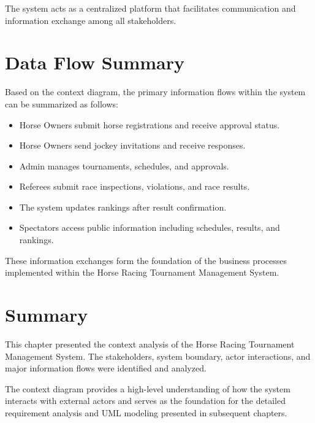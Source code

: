 The system acts as a centralized platform that facilitates communication and information exchange among all stakeholders.

\section{Data Flow Summary}

Based on the context diagram, the primary information flows within the system can be summarized as follows:

\begin{itemize}
	\item Horse Owners submit horse registrations and receive approval status.
	\item Horse Owners send jockey invitations and receive responses.
	\item Admin manages tournaments, schedules, and approvals.
	\item Referees submit race inspections, violations, and race results.
	\item The system updates rankings after result confirmation.
	\item Spectators access public information including schedules, results, and rankings.
\end{itemize}

These information exchanges form the foundation of the business processes implemented within the Horse Racing Tournament Management System.

\section{Summary}

This chapter presented the context analysis of the Horse Racing Tournament Management System. The stakeholders, system boundary, actor interactions, and major information flows were identified and analyzed.

The context diagram provides a high-level understanding of how the system interacts with external actors and serves as the foundation for the detailed requirement analysis and UML modeling presented in subsequent chapters.
